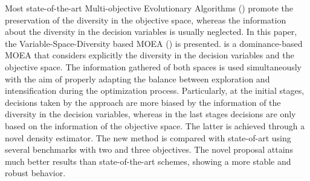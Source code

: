 Most state-of-the-art Multi-objective Evolutionary Algorithms (\MOEAS{}) promote the preservation of the diversity 
in the objective space, whereas the information about the diversity in the decision variables is usually neglected.
%
In this paper, the Variable-Space-Diversity based MOEA (\VSDMOEA{}) is presented.
%
\VSDMOEA{} is a dominance-based MOEA that considers explicitly the diversity in the decision variables and the objective space.
%
The information gathered of both spaces is used simultaneously with the aim of properly adapting the balance between exploration
and intensification during the optimization process.
%
Particularly, at the initial stages, decisions taken by the approach are more biased by the information of the diversity in 
the decision variables, whereas in the last stages decisions are only based on the information of the objective space.
%
The latter is achieved through a novel density estimator.
%
The new method is compared with state-of-art \MOEAS{} using several benchmarks with two and three objectives.
%
The novel proposal attains much better results than state-of-the-art schemes, showing a more stable 
and robust behavior.
